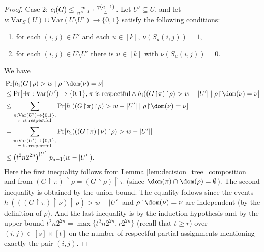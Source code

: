 \begin{proof}
Case 2: $c_{\textnormal{i}}(G) \leq \frac{w}{n^{a-1}} \cdot \frac{\gamma(a-1)}{4}$. 
Let $U' \subseteq U$, and let $\nu : \text{Var}_S(U) \cup \text{Var}(U \setminus U') \rightarrow \{0,1\}$ satisfy the following conditions:
\begin{enumerate}[($\nu$1)]
\item \label{item:nu_1_on_U'} for each $(i,j) \in U'$ and each $u \in [k]$, $\nu(S_u(i,j)) = 1$, 
\item \label{item:nu_0_outside_U'} for each $(i,j) \in U \setminus U'$ there is $u \in [k]$ with $\nu(S_u(i,j)) = 0$.
\end{enumerate}  
We have
\begin{align*}
& \Pr[h_{\text{i}}(G \! \restriction \! \rho) > w \mid \rho \! \restriction \! \dom(\nu) = \nu]  \\
& \leq \Pr [ \exists \pi : \text{Var}(U') \rightarrow \{0,1\}, \pi \text{ is respectful} \land h_{\text{i}}((G \! \restriction \! \pi) \! \restriction \! \rho) > w - |U'| \mid \rho \! \restriction \! \dom(\nu) = \nu] \\
& \leq   \sum_{\substack{\pi : \text{Var}(U') \rightarrow \{0,1\}, \\ \pi \text{ is respectful}}} \Pr [h_{\text{i}}((G \! \restriction \! \pi) \! \restriction \! \rho) > w- |U'| \mid \rho \! \restriction \! \dom(\nu) = \nu] \\
& = \sum_{\substack{\pi : \text{Var}(U') \rightarrow \{0,1\}, \\ \pi \text{ is respectful}}} \Pr [h_{\text{i}}(((G \! \restriction \! \pi) \! \restriction \!  \nu) \! \restriction \! \rho) > w- |U'|] \\
& \leq \left(t^2 n 2^{2n} \right)^{|U'|} p_{a-1}(w - |U'|).
\end{align*}
Here the first inequality follows from Lemma \ref{lem:decision_tree_composition} and from $(G \! \restriction \! \pi) \! \restriction \! \rho = (G \! \restriction \! \rho) \! \restriction \! \pi$ (since $\dom(\pi) \cap \dom(\rho) = \emptyset$). The second inequality is obtained by the union bound. The equality follows since the events $h_{\text{i}}(((G \! \restriction \! \pi) \! \restriction \! \nu) \! \restriction \! \rho) > w- |U'|$ and $\rho \! \restriction \! \dom(\nu) = \nu$ are independent (by the definition of $\rho$). And the last inequality is by the induction hypothesis and by the upper bound $t^2n2^{2n} = \max \{t^2n2^{2n}, r2^{2n} \}$ (recall that $t \geq r$) over $(i,j) \in [s] \times [t]$ on the number of respectful partial assignments mentioning exactly the pair $(i,j)$.  


\end{proof}
